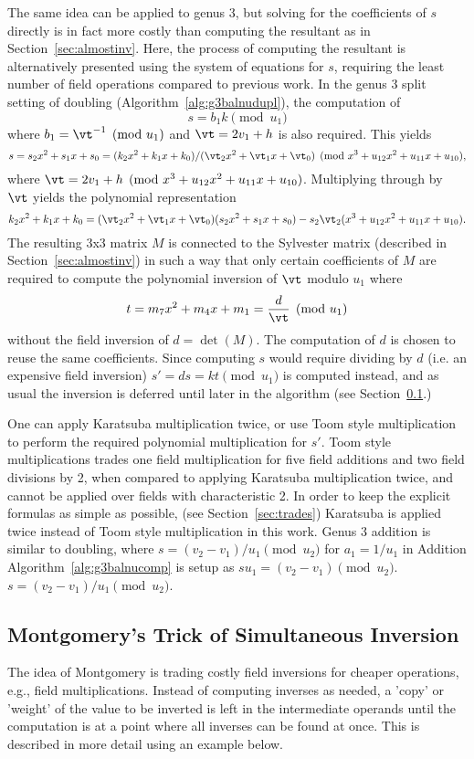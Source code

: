The same idea can be applied to genus 3, but solving for the coefficients of $s$
directly is in fact more costly than computing the resultant as in
Section~\ref{sec:almostinv}. Here, the process of computing the resultant is
alternatively presented using the system of equations for $s$, requiring the
least number of field operations compared to previous work. In the genus 3 split
setting of doubling (Algorithm~\ref{alg:g3balnudupl}), the computation of $$s =
b_1k \pmod{u_1}$$ where $b_1 = \vt^{-1} \pmod{u_1}$ and $\vt = 2v_1 + h$ is also
required. This yields $$s = s_2x^2 + s_1x + s_0 = (k_2x^2 + k_1x +
k_0)/(\vt_2x^2 + \vt_1x + \vt_0) \pmod{x^3 + u_{12}x^2 + u_{11}x + u_{10}},$$
where $\vt = 2v_1 + h \pmod{x^3 + u_{12}x^2 + u_{11}x + u_{10}}$.  Multiplying
through by $\vt$ yields the polynomial representation $$ k_2x^2 + k_1x + k_0 =
(\vt_2x^2 + \vt_1x + \vt_0)(s_2x^2 + s_1x + s_0) - s_2\vt_2(x^3 + u_{12}x^2 +
u_{11}x + u_{10}).$$ The resulting 3x3 matrix $M$ is connected to the
Sylvester matrix (described in Section~\ref{sec:almostinv}) in such a way that
only certain coefficients of $M$ are required to compute the polynomial
inversion of $\vt$ modulo $u_1$ where $$ t = m_7x^2 + m_4x + m_1 = \frac{d}{\vt}
\pmod{u_1}$$ without the field inversion of $d = \det(M)$. The computation of
$d$ is chosen to reuse the same coefficients. Since computing $s$ would require
dividing by $d$ (i.e. an expensive field inversion) $s' = ds = kt \pmod{u_1}$ is
computed instead, and as usual the inversion is deferred until later in the
algorithm (see Section~\ref{sec:montgomery}.)

One can apply Karatsuba multiplication twice, or use Toom style
multiplication~\cite[p.294]{Knuth:vol2} to perform the required polynomial
multiplication for $s'$. Toom style multiplications trades one field
multiplication for five field additions and two field divisions by 2, when
compared to applying Karatsuba multiplication twice, and cannot be applied over
fields with characteristic 2. In order to keep the explicit formulas as simple
as possible, (see Section~\ref{sec:trades}) Karatsuba is applied twice instead
of Toom style multiplication in this work.  Genus 3 addition is similar to
doubling, where $s = (v_2 - v_1)/u_1 \pmod{u_2}$ for $a_1 = 1/u_1$ in Addition
Algorithm~\ref{alg:g3balnucomp} is setup as $su_1 = (v_2 - v_1) \pmod{u_2}$. $s
= (v_2 - v_1)/u_1 \pmod{u_2}$.

\subsection{Montgomery's Trick of Simultaneous Inversion}
\label{sec:montgomery}
The idea of Montgomery is trading costly field inversions for cheaper
operations, e.g., field multiplications. Instead of computing inverses as
needed, a 'copy' or 'weight' of the value to be inverted is left in the intermediate
operands until the computation is at a point where all inverses can be found at
once. This is described in more detail using an example below.

